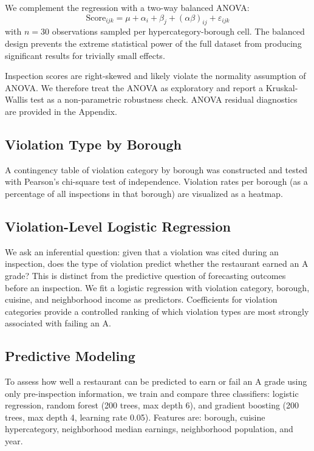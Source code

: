 \documentclass[11pt, twocolumn]{article}
\begin{document}
We complement the regression with a two-way balanced ANOVA:
\[
  \text{Score}_{ijk} = \mu + \alpha_i + \beta_j + (\alpha\beta)_{ij} + \varepsilon_{ijk}
\]
with $n = 30$ observations sampled per hypercategory-borough cell.
The balanced design prevents the extreme statistical power of the full
dataset from producing significant results for trivially small effects.

Inspection scores are right-skewed and likely violate the normality
assumption of ANOVA. We therefore treat the ANOVA as exploratory and
report a Kruskal-Wallis test as a non-parametric robustness check.
ANOVA residual diagnostics are provided in the Appendix.

\subsection{Violation Type by Borough}

A contingency table of violation category by borough was constructed and
tested with Pearson's chi-square test of independence. Violation rates
per borough (as a percentage of all inspections in that borough) are
visualized as a heatmap.

\subsection{Violation-Level Logistic Regression}

We ask an inferential question: given that a violation was cited during
an inspection, does the type of violation predict whether the restaurant
earned an A grade? This is distinct from the predictive question of
forecasting outcomes before an inspection. We fit a logistic regression
with violation category, borough, cuisine, and neighborhood income as
predictors. Coefficients for violation categories provide a controlled
ranking of which violation types are most strongly associated with
failing an A.

\subsection{Predictive Modeling}

To assess how well a restaurant can be predicted to earn or fail an A
grade using only pre-inspection information, we train and compare three
classifiers: logistic regression, random forest (200 trees, max depth 6),
and gradient boosting (200 trees, max depth 4, learning rate 0.05).
Features are: borough, cuisine hypercategory, neighborhood median
earnings, neighborhood population, and year.
\end{document}

